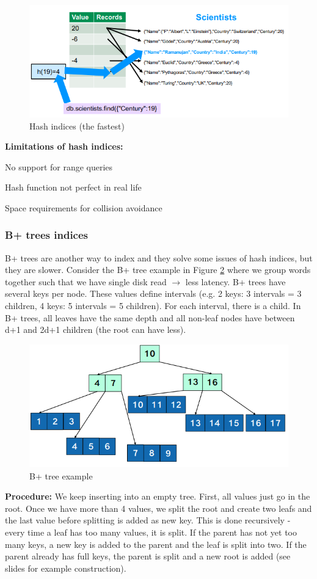 \documentclass[11pt,oneside,a4paper]{article}
\begin{document}
\begin{figure}[b!]
	\centering
	\includegraphics[width=0.45\linewidth]{figures/docstores_hash_indices}
	\caption{Hash indices (the fastest)}
	\label{fig:docstoreshashindices}
\end{figure}

\textbf{Limitations of hash indices:}

\begin{compactitem}
\item No support for range queries
\item Hash function not perfect in real life
\item Space requirements for collision avoidance
\end{compactitem}


\subsubsection{B+ trees indices}

B+ trees are another way to index and they solve some issues of hash indices, but they are slower. Consider the B+ tree example in Figure \ref{fig:docstoresbplusex} where we group words together such that we have single disk read $\rightarrow$ less latency. B+ trees have several keys per node. These values define intervals (e.g. 2 keys: 3 intervals = 3 children, 4 keys: 5 intervals = 5 children). For each interval, there is a child. In B+ trees, all leaves have the same depth and all non-leaf nodes have between d+1 and 2d+1 children (the root can have less).

\begin{figure}[hb!]
	\centering
	\includegraphics[width=0.5\linewidth]{figures/docstores_bplus_ex}
	\caption{B+ tree example}
	\label{fig:docstoresbplusex}
\end{figure}

\textbf{Procedure:} We keep inserting into an empty tree. First, all values just go in the root. Once we have more than 4 values, we split the root and create two leafs and the last value before splitting is added as new key. This is done recursively - every time a leaf has too many values, it is split. If the parent has not yet too many keys, a new key is added to the parent and the leaf is split into two. If the parent already has full keys, the parent is split and a new root is added (see slides for example construction).
\end{document}
